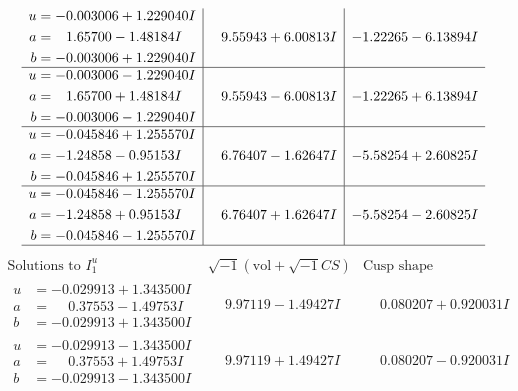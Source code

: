 \documentclass[1p]{elsarticle_modified}
\theoremstyle{definition}
\newcommand{\I}{\sqrt{-1}}
\begin{document}
$$\begin{array}{c|c|c}
\begin{aligned}
u &= -0.003006 + 1.229040 I \\
a &= \phantom{-}1.65700 - 1.48184 I \\
b &= -0.003006 + 1.229040 I\end{aligned}
 & \phantom{-}9.55943 + 6.00813 I & -1.22265 - 6.13894 I \\ \hline\begin{aligned}
u &= -0.003006 - 1.229040 I \\
a &= \phantom{-}1.65700 + 1.48184 I \\
b &= -0.003006 - 1.229040 I\end{aligned}
 & \phantom{-}9.55943 - 6.00813 I & -1.22265 + 6.13894 I \\ \hline\begin{aligned}
u &= -0.045846 + 1.255570 I \\
a &= -1.24858 - 0.95153 I \\
b &= -0.045846 + 1.255570 I\end{aligned}
 & \phantom{-}6.76407 - 1.62647 I & -5.58254 + 2.60825 I \\ \hline\begin{aligned}
u &= -0.045846 - 1.255570 I \\
a &= -1.24858 + 0.95153 I \\
b &= -0.045846 - 1.255570 I\end{aligned}
 & \phantom{-}6.76407 + 1.62647 I & -5.58254 - 2.60825 I\\
 \hline 
 \end{array}$$\newpage$$\begin{array}{c|c|c}  
\text{Solutions to }I^u_{1}& \I (\text{vol} + \sqrt{-1}CS) & \text{Cusp shape}\\
 \hline 
\begin{aligned}
u &= -0.029913 + 1.343500 I \\
a &= \phantom{-}0.37553 - 1.49753 I \\
b &= -0.029913 + 1.343500 I\end{aligned}
 & \phantom{-}9.97119 - 1.49427 I & \phantom{-}0.080207 + 0.920031 I \\ \hline\begin{aligned}
u &= -0.029913 - 1.343500 I \\
a &= \phantom{-}0.37553 + 1.49753 I \\
b &= -0.029913 - 1.343500 I\end{aligned}
 & \phantom{-}9.97119 + 1.49427 I & \phantom{-}0.080207 - 0.920031 I \\ \hline\begin{aligned}

\end{aligned}
\end{array}$$
\end{document}
